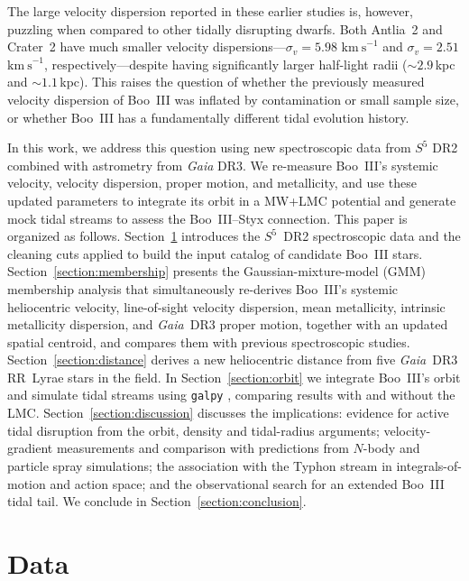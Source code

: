 \documentclass[twocolumn]{aastex631}
\newcommand{\SSSSS}{${S}^5$\xspace}
\newcommand{\gaia}{\textit{Gaia}\xspace}
\newcommand{\vlosUnits}{$\mathrm{km~s}^{-1}$\xspace}
\begin{document}
The large velocity dispersion reported in these earlier studies is, however, puzzling when compared to other tidally disrupting dwarfs. Both Antlia~2 and Crater~2 have much smaller velocity dispersions---$\sigma_v = 5.98$ \vlosUnits \citep{Ji2021} and $\sigma_v = 2.51$ \vlosUnits \citep{Limberg2025}, respectively---despite having significantly larger half-light radii ($\sim 2.9$\,kpc and $\sim 1.1$\,kpc). This raises the question of whether the previously measured velocity dispersion of Boo~III was inflated by contamination or small sample size, or whether Boo~III has a fundamentally different tidal evolution history.

In this work, we address this question using new spectroscopic data from \SSSSS DR2 combined with astrometry from \gaia DR3. We re-measure Boo~III's systemic velocity, velocity dispersion, proper motion, and metallicity, and use these updated parameters to integrate its orbit in a MW+LMC potential and generate mock tidal streams to assess the Boo~III--Styx connection. This paper is organized as follows. Section~\ref{section:data} introduces the \SSSSS\ DR2 spectroscopic data and the cleaning cuts applied to build the input catalog of candidate Boo~III stars. Section~\ref{section:membership} presents the Gaussian-mixture-model (GMM) membership analysis that simultaneously re-derives Boo~III's systemic heliocentric velocity, line-of-sight velocity dispersion, mean metallicity, intrinsic metallicity dispersion, and \gaia\ DR3 proper motion, together with an updated spatial centroid, and compares them with previous spectroscopic studies. Section~\ref{section:distance} derives a new heliocentric distance from five \gaia\ DR3 RR~Lyrae stars in the field. In Section~\ref{section:orbit} we integrate Boo~III's orbit and simulate tidal streams using \texttt{galpy} \citep{Bovy2015}, comparing results with and without the LMC. Section~\ref{section:discussion} discusses the implications: evidence for active tidal disruption from the orbit, density and tidal-radius arguments; velocity-gradient measurements and comparison with predictions from $N$-body and particle spray simulations; the association with the Typhon stream in integrals-of-motion and action space; and the observational search for an extended Boo~III tidal tail. We conclude in Section~\ref{section:conclusion}.


\section{Data} \label{section:data}
\end{document}
